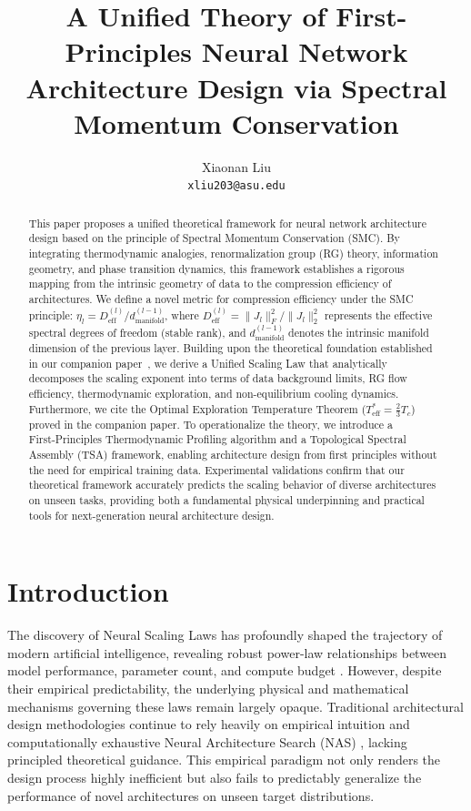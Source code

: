 \documentclass[11pt, a4paper]{article}
\title{A Unified Theory of First-Principles Neural Network Architecture Design via Spectral Momentum Conservation}
\author{
  Xiaonan Liu \\
  \texttt{xliu203@asu.edu}
}
\date{}
\theoremstyle{definition}
\begin{document}
\maketitle

\begin{abstract}
This paper proposes a unified theoretical framework for neural network architecture design based on the principle of Spectral Momentum Conservation (SMC). By integrating thermodynamic analogies, renormalization group (RG) theory, information geometry, and phase transition dynamics, this framework establishes a rigorous mapping from the intrinsic geometry of data to the compression efficiency of architectures. We define a novel metric for compression efficiency under the SMC principle: $\eta_l = D_{\text{eff}}^{(l)} / d_{\text{manifold}}^{(l-1)}$, where $D_{\text{eff}}^{(l)} = \|J_l\|_F^2 / \|J_l\|_2^2$ represents the effective spectral degrees of freedom (stable rank), and $d_{\text{manifold}}^{(l-1)}$ denotes the intrinsic manifold dimension of the previous layer. Building upon the theoretical foundation established in our companion paper~\cite{liu2024unified}, we derive a Unified Scaling Law that analytically decomposes the scaling exponent into terms of data background limits, RG flow efficiency, thermodynamic exploration, and non-equilibrium cooling dynamics. Furthermore, we cite the Optimal Exploration Temperature Theorem ($T_{\text{eff}}^* = \frac{2}{3}T_c$) proved in the companion paper. To operationalize the theory, we introduce a First‑Principles Thermodynamic Profiling algorithm and a Topological Spectral Assembly (TSA) framework, enabling architecture design from first principles without the need for empirical training data. Experimental validations confirm that our theoretical framework accurately predicts the scaling behavior of diverse architectures on unseen tasks, providing both a fundamental physical underpinning and practical tools for next-generation neural architecture design.
\end{abstract}

\section{Introduction}
\label{sec:intro}

The discovery of Neural Scaling Laws has profoundly shaped the trajectory of modern artificial intelligence, revealing robust power-law relationships between model performance, parameter count, and compute budget \cite{kaplan2020scaling, hoffmann2022training}. However, despite their empirical predictability, the underlying physical and mathematical mechanisms governing these laws remain largely opaque. Traditional architectural design methodologies continue to rely heavily on empirical intuition and computationally exhaustive Neural Architecture Search (NAS) \cite{zoph2016neural}, lacking principled theoretical guidance. This empirical paradigm not only renders the design process highly inefficient but also fails to predictably generalize the performance of novel architectures on unseen target distributions.
\end{document}
